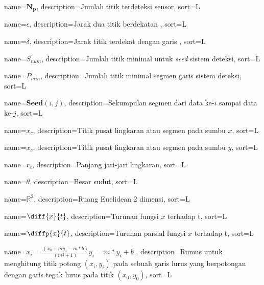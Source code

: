 %
{%
  name={\ensuremath{\mathbf{N_p}}},
  description={Jumlah titik terdeteksi sensor},
  sort={L}
}

%
{%
  name={\ensuremath{\epsilon}},
  description={Jarak dua titik berdekatan \lidar},
  sort={L}
}

%
{%
  name={\ensuremath{\delta}},
  description={Jarak titik terdekat dengan garis \lidar},
  sort={L}
}

%
{%
  name={\ensuremath{S_{num}}},
  description={Jumlah titik minimal untuk \textit{seed} sistem deteksi},
  sort={L}
}

%
{%
  name={\ensuremath{P_{min}}},
  description={Jumlah titik minimal segmen garis sistem deteksi},
  sort={L}
}

%
{%
  name={\ensuremath{\mathbf{Seed}(i,j)}},
  description={Sekumpulan segmen dari data ke-$i$ sampai data ke-$j$},
  sort={L}
}



%
{%
  name={\ensuremath{x_c}},
  description={Titik pusat lingkaran atau segmen pada sumbu $x$},
  sort={L}
}

%
{%
  name={\ensuremath{x_c}},
  description={Titik pusat lingkaran atau segmen pada sumbu $y$},
  sort={L}
}

%
{%
  name={\ensuremath{r_c}},
  description={Panjang jari-jari lingkaran},
  sort={L}
}

%
{%
  name={\ensuremath{\theta}},
  description={Besar sudut},
  sort={L}
}

%
{%
  name={\ensuremath{\mathbb{R}^2}},
  description={Ruang Euclidean 2 dimensi},
  sort={L}
}

%
{%
  name={\ensuremath{\diff{x}{t}}},
  description={Turunan fungsi $x$ terhadap t},
  sort={L}
}

%
{%
  name={\ensuremath{\diffp{x}{t}}},
  description={Turunan parsial fungsi $x$ terhadap t},
  sort={L}
}



%
{%
  name={\ensuremath{x_i = \frac{(x_0 + my_0 - m*b)}{(m^2 + 1)}}\newline \ensuremath{y_i = m*y_i + b}
    },
  description={Rumus untuk menghitung titik potong $(x_i,y_i)$ pada sebuah garis lurus yang berpotongan dengan garis tegak lurus pada titik $(x_0,y_0)$},
  sort={L}
}






